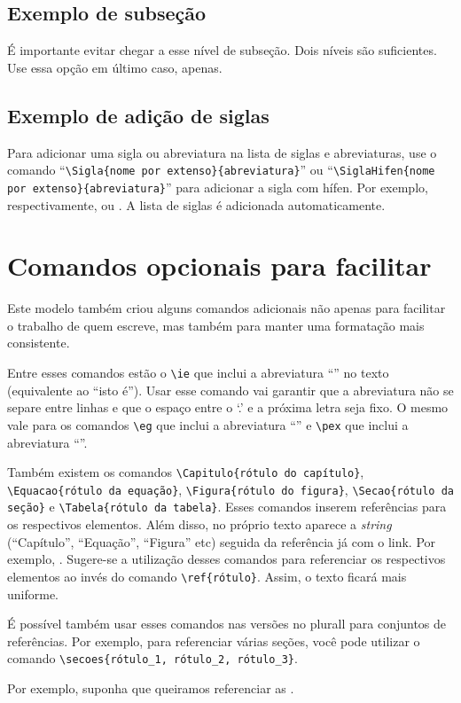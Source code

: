 \subsection{Exemplo de subseção}
É importante evitar chegar a esse nível de subseção. Dois níveis são suficientes. Use essa opção em último caso, apenas.


\subsection{Exemplo de adição de siglas}\label{subsec:siglas}
Para adicionar uma sigla ou abreviatura na lista de siglas e abreviaturas, use o comando ``\texttt{\textbackslash{}Sigla\{nome por extenso\}\{abreviatura\}}'' ou ``\texttt{\textbackslash{}SiglaHifen\{nome por extenso\}\{abreviatura\}}'' para adicionar a sigla com hífen. 
Por exemplo, respectivamente,  ou . A lista de siglas é adicionada automaticamente.

\section{Comandos opcionais para facilitar}
Este modelo também criou alguns comandos adicionais não apenas para facilitar o trabalho de quem escreve, mas também para manter uma formatação mais consistente.

Entre esses comandos estão o \texttt{\textbackslash{}ie} que inclui a abreviatura ``\ie'' no texto (equivalente ao ``isto é''). Usar esse comando vai garantir que a abreviatura não se separe entre linhas e que o espaço entre o `.' e a próxima letra seja fixo. O mesmo vale para os comandos \texttt{\textbackslash{}eg} que inclui a abreviatura ``\eg'' e \texttt{\textbackslash{}pex} que inclui a abreviatura ``\pex''.

Também existem os comandos \texttt{\textbackslash{}Capitulo\{rótulo do capítulo\}}, \texttt{\textbackslash{}Equacao\{rótulo da equação\}}, \texttt{\textbackslash{}Figura\{rótulo do figura\}}, \texttt{\textbackslash{}Secao\{rótulo da seção\}} e \texttt{\textbackslash{}Tabela\{rótulo da tabela\}}. Esses comandos inserem referências para os respectivos elementos. Além disso, no próprio texto aparece a \textit{string} (``Capítulo'', ``Equação'', ``Figura'' etc) seguida da referência já com o link. Por exemplo, . Sugere-se a utilização desses comandos para referenciar os respectivos elementos ao invés do comando \texttt{\textbackslash{}ref\{rótulo\}}. Assim, o texto ficará mais uniforme. 

É possível também usar esses comandos nas versões no plurall para conjuntos de referências. Por exemplo, para referenciar várias seções, você pode utilizar o comando \texttt{\textbackslash{}secoes\{rótulo\_1, rótulo\_2, rótulo\_3\}}.

Por exemplo, suponha que queiramos referenciar as .